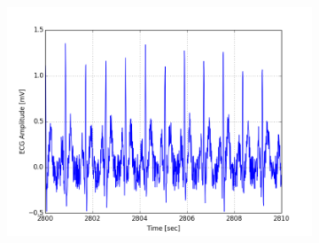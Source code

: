 \documentclass[paper=a4, fontsize=11pt]{scrartcl}
\numberwithin{equation}{section}		%
\numberwithin{figure}{section}			%
\numberwithin{table}{section}		    %
\begin{document}
\begin{appendices}
\begin{figure}[H]
\begin{subfigure}[b]{0.3\textwidth}
		\includegraphics[width=\textwidth]{sim/ecg_51}
	\end{subfigure}
\end{figure}


\end{appendices}
\end{document}
